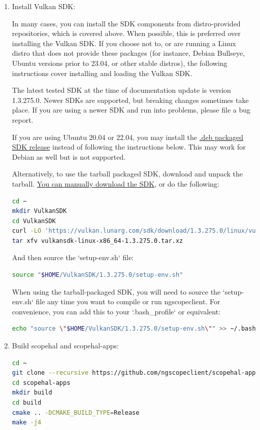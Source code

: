 \begin{enumerate}
\item Install Vulkan SDK:

In many cases, you can install the SDK components from distro-provided repositories, which is covered above. When
possible, this is preferred over installing the Vulkan SDK. If you choose not to, or are running a Linux distro that
does not provide these packages (for instance, Debian Bullseye, Ubuntu versions prior to 23.04, or other stable
distros), the following instructions cover installing and loading the Vulkan SDK.

The latest tested SDK at the time of documentation update is version 1.3.275.0. Newer SDKs are supported, but breaking
changes sometimes take place.
If you are using a newer SDK and run into problems, please file a bug report.

If you are using Ubuntu 20.04 or 22.04, you may install the
\href{https://packages.lunarg.com}{.deb packaged SDK release} instead of following the instructions below. This may
work for Debian as well but is not supported.

Alternatively, to use the tarball packaged SDK, download and unpack the tarball.
\href{https://vulkan.lunarg.com/sdk/home}{You can manually download the SDK}, or do the following:
\begin{lstlisting}[language=sh, numbers=none]
cd ~
mkdir VulkanSDK
cd VulkanSDK
curl -LO 'https://vulkan.lunarg.com/sdk/download/1.3.275.0/linux/vulkansdk-linux-x86_64-1.3.275.0.tar.xz'
tar xfv vulkansdk-linux-x86_64-1.3.275.0.tar.xz
\end{lstlisting}

And then source the `setup-env.sh` file:
\begin{lstlisting}[language=sh, numbers=none]
source "$HOME/VulkanSDK/1.3.275.0/setup-env.sh"
\end{lstlisting}

When using the tarball-packaged SDK, you will need to source the `setup-env.sh` file any time you want to compile
or run ngscopeclient. For convenience, you can add this to your `.bash\_profile` or equivalent:
\begin{lstlisting}[language=sh, numbers=none]
echo "source \"$HOME/VulkanSDK/1.3.275.0/setup-env.sh\"" >> ~/.bash_profile
\end{lstlisting}

\item Build scopehal and scopehal-apps:

\begin{lstlisting}[language=sh, numbers=none]
cd ~
git clone --recursive https://github.com/ngscopeclient/scopehal-apps.git
cd scopehal-apps
mkdir build
cd build
cmake .. -DCMAKE_BUILD_TYPE=Release
make -j4
\end{lstlisting}

\end{enumerate}

